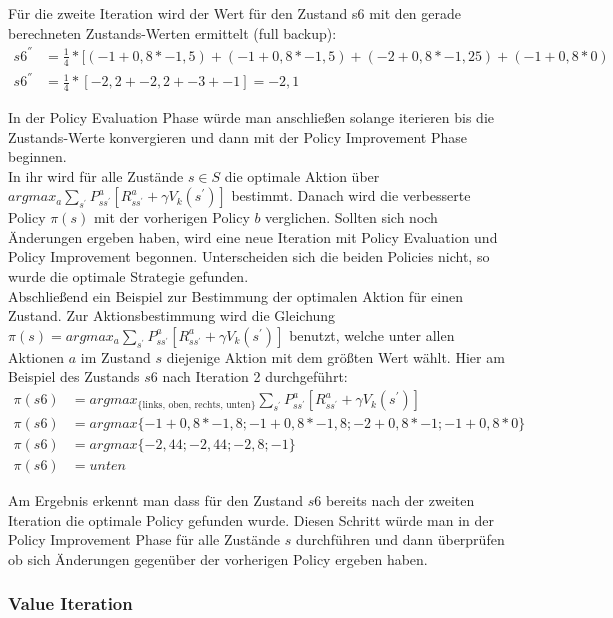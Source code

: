 \documentclass[10pt]{scrartcl}
\begin{document}
Für die zweite Iteration wird der Wert für den Zustand s6 mit den gerade berechneten Zustands-Werten ermittelt (full backup):
\begin{align}
	s6^{''} &= \frac{1}{4} * [(-1 + 0,8 * -1,5) + (-1 + 0,8 * -1,5) + (-2 + 0,8 * -1,25) + (-1 + 0,8 * 0)\\
	s6^{''} &= \frac{1}{4} * [ -2,2 + -2,2 + -3 + -1 ] = -2,1
\end{align}

In der Policy Evaluation Phase würde man anschließen solange iterieren bis die Zustands-Werte konvergieren und dann mit der Policy Improvement Phase beginnen.\\
In ihr wird für alle Zustände $s \in S$ die optimale Aktion über 
$argmax_{a} \sum_{s^{'}} P^a_{ss^{'}} [R^a_{ss^{'}} + \gamma V_{k} (s^{'})]$ bestimmt. 
Danach wird die verbesserte Policy $\pi(s)$ mit der vorherigen Policy $b$ verglichen.
Sollten sich noch Änderungen ergeben haben, wird eine neue Iteration mit Policy Evaluation und Policy Improvement begonnen.
Unterscheiden sich die beiden Policies nicht, so wurde die optimale Strategie gefunden.\\

Abschließend ein Beispiel zur Bestimmung der optimalen Aktion für einen Zustand. Zur Aktionsbestimmung wird die Gleichung $\pi(s) = argmax_{a} \sum_{s^{'}} P^a_{ss^{'}} [R^a_{ss^{'}} + \gamma V_{k} (s^{'})]$ benutzt, welche unter allen Aktionen $a$ im Zustand $s$ diejenige Aktion mit dem größten Wert wählt. Hier am Beispiel des Zustands $s6$ nach Iteration 2 durchgeführt:
\begin{align}
	\pi(s6) &= argmax_{\text{\{links, oben, rechts, unten\}}} \sum_{s^{'}} P^a_{ss^{'}} [R^a_{ss^{'}} + \gamma V_{k} (s^{'})]\\	
	\pi(s6) &= argmax \{ -1 + 0,8 * -1,8; -1 + 0,8 * -1,8; -2 + 0,8 * -1; -1 + 0,8 * 0 \}\\
	\pi(s6) &= argmax \{ -2,44; -2,44; -2,8; -1 \}\\
	\pi(s6) &= unten
\end{align}

Am Ergebnis erkennt man dass für den Zustand $s6$ bereits nach der zweiten Iteration die optimale Policy gefunden wurde.
Diesen Schritt würde man in der Policy Improvement Phase für alle Zustände $s$ durchführen und dann überprüfen ob sich Änderungen gegenüber der vorherigen Policy ergeben haben.

\subsubsection{Value Iteration}
\label{sec:anwendung_value_iteration}
\end{document}
